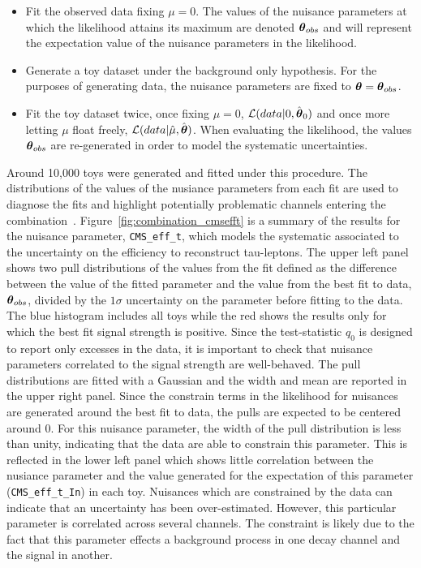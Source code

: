 \begin{itemize}
\item{Fit the observed data fixing $\mu=0$. The values of the nuisance parameters 
at which the likelihood attains its maximum are denoted ${\boldsymbol{\theta}}_{obs}$ and will represent 
the expectation value of the nuisance parameters in the likelihood.}
\item{Generate a toy dataset under the background only hypothesis. For the purposes of
generating data, the nuisance parameters are fixed to ${\boldsymbol{\theta}}={\boldsymbol{\theta}}_{obs}$.}
\item{Fit the toy dataset twice, once fixing $\mu=0$, $\mathcal{L}(data|0,\hat{{\boldsymbol{\theta}}}_{0})$ 
and once more letting 
$\mu$ float freely, $\mathcal{L}(data|\hat{\mu},\hat{{\boldsymbol{\theta}}})$. When 
evaluating the likelihood, the values ${\boldsymbol{\theta}}_{obs}$ are re-generated in order to 
model the systematic uncertainties.}
\end{itemize}
Around 10,000 toys were generated and fitted under this procedure. The distributions
of the values of the nusiance parameters from each fit are used to diagnose the fits 
and highlight potentially problematic channels entering the combination~\cite{AN-12-317}.
Figure~\ref{fig:combination_cmsefft} is a summary of the results for the nuisance parameter, \texttt{CMS\_eff\_t}, 
which models the systematic associated to the uncertainty on the efficiency to reconstruct tau-leptons.
The upper left panel shows two pull distributions of the values from the fit defined as the difference between 
the value of the fitted parameter and the value from the best fit to data, ${\boldsymbol{\theta}}_{obs}$, 
divided by the $1\sigma$ uncertainty on the parameter before fitting to the data. 
The blue histogram includes all toys while the red shows the results
only for which the best fit signal strength is positive. Since the test-statistic $q_{0}$ is designed 
to report only excesses in the data, it is important to check that nuisance parameters correlated to 
the signal strength are well-behaved. The pull distributions are fitted with a Gaussian and the width and mean 
are reported in the upper right panel. Since the constrain terms in the 
likelihood for nuisances are generated around the best fit to data, the pulls are expected to be centered 
around 0. For this nuisance parameter, the width of the pull distribution is less than unity, indicating
that the data are able to constrain this parameter. This is reflected in the lower left panel 
which shows little correlation between the nusiance parameter and the value generated for the expectation
of this parameter (\texttt{CMS\_eff\_t\_In}) in each toy. Nuisances which are constrained by the data can indicate that an
uncertainty has been over-estimated. However, this particular parameter is correlated across several
channels. The constraint is likely due to the fact that this parameter effects a background process
in one decay channel and the signal in another.



